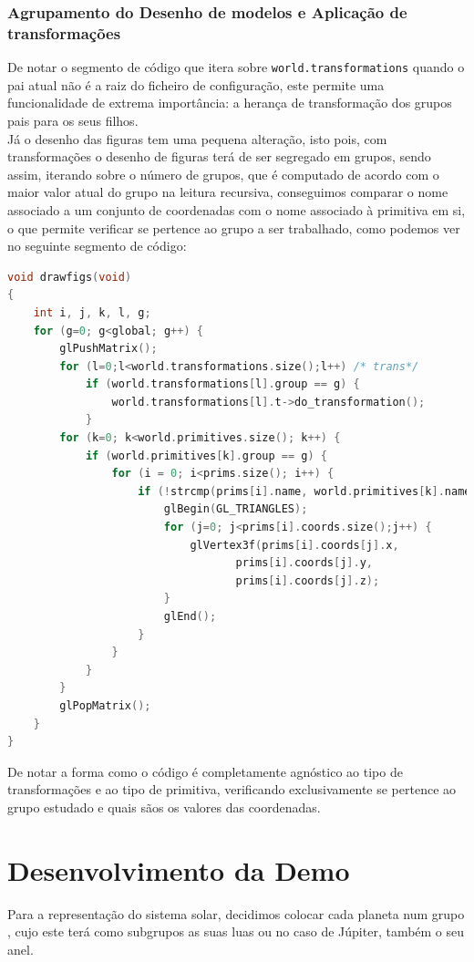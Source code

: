 \documentclass[14pt, a4paper]{article}
\begin{document}
\subsubsection{Agrupamento do Desenho de modelos e Aplicação de transformações}\label{subsec:gera}
De notar o segmento de código que itera sobre \verb|world.transformations| quando o pai atual não é a
raiz do ficheiro de configuração, este permite uma funcionalidade de extrema importância: a herança de
transformação dos grupos pais para os seus filhos.\\
Já o desenho das figuras tem uma pequena alteração, isto pois, com transformações o desenho de figuras
terá de ser segregado em grupos, sendo assim, iterando sobre o número de grupos, que é
computado de acordo com o maior valor atual do grupo na leitura recursiva, conseguimos comparar o nome associado a um conjunto de coordenadas com o nome associado à primitiva em si, o que permite verificar
se pertence ao grupo a ser trabalhado, como podemos ver no seguinte segmento de código:
\begin{lstlisting}[language=c++]
void drawfigs(void)
{
	int i, j, k, l, g;
    for (g=0; g<global; g++) {
		glPushMatrix();
		for (l=0;l<world.transformations.size();l++) /* trans*/
			if (world.transformations[l].group == g) {
				world.transformations[l].t->do_transformation();
            }
        for (k=0; k<world.primitives.size(); k++) {
            if (world.primitives[k].group == g) {
                for (i = 0; i<prims.size(); i++) {
                    if (!strcmp(prims[i].name, world.primitives[k].name)) {
		                glBegin(GL_TRIANGLES);
                        for (j=0; j<prims[i].coords.size();j++) {
                            glVertex3f(prims[i].coords[j].x,
                                   prims[i].coords[j].y,
                                   prims[i].coords[j].z);
                        }
		                glEnd();
                    }
                }
            }
        }
		glPopMatrix();
	}
}
\end{lstlisting}
De notar a forma como o código é completamente agnóstico ao tipo de transformações e ao tipo de
primitiva, verificando exclusivamente se pertence ao grupo estudado e quais sãos os valores das
coordenadas.

\section{Desenvolvimento da Demo} \label{sec:demo}
Para a representação do sistema solar, decidimos colocar cada planeta num grupo , cujo este terá como subgrupos as suas luas ou no caso de Júpiter, também o seu anel.
\end{document}
